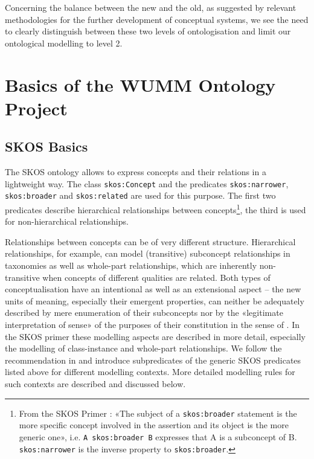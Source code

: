 \documentclass[11pt,a4paper]{article}
\begin{document}
Concerning the balance between the new and the old, as suggested by relevant
methodologies for the further development of conceptual systems, we see the
need to clearly distinguish between these two levels of ontologisation and
limit our ontological modelling to level 2.

\section{Basics of the WUMM Ontology Project}

\subsection{SKOS Basics}

The SKOS ontology allows to express concepts and their relations in a
lightweight way. The class \texttt{skos:Concept} and the predicates
\texttt{skos:narrower}, \texttt{skos:broader} and \texttt{skos:related} are
used for this purpose. The first two predicates describe hierarchical
relationships between concepts\footnote{From the SKOS Primer
  \cite{SKOS-Primer}: «The subject of a \texttt{skos:broader} statement is the
  more specific concept involved in the assertion and its object is the more
  generic one», i.e. \texttt{A skos:broader B} expresses that A is a
  subconcept of B.  \texttt{skos:narrower} is the inverse property to
  \texttt{skos:broader}.}, the third is used for non-hierarchical
relationships.

Relationships between concepts can be of very different structure.
Hierarchical relationships, for example, can model (transitive) subconcept
relationships in taxonomies as well as whole-part relationships, which are
inherently non-transitive when concepts of different qualities are related.
Both types of conceptualisation have an intentional as well as an extensional
aspect -- the new units of meaning, especially their emergent properties, can
neither be adequately described by mere enumeration of their subconcepts nor
by the «legitimate interpretation of sense» of the purposes of their
constitution in the sense of \cite{BergerLuckmann}. In the SKOS primer
\cite{SKOS-Primer} these modelling aspects are described in more detail,
especially the modelling of class-instance and whole-part relationships. We
follow the recommendation in \cite[Sect 4.7]{SKOS-Primer} and introduce
subpredicates of the generic SKOS predicates listed above for different
modelling contexts. More detailed modelling rules for such contexts are
described and discussed below.
\end{document}
